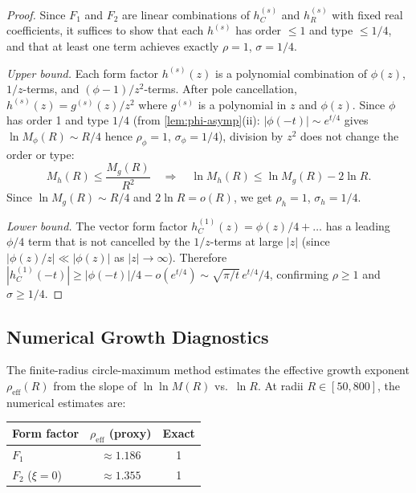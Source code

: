 \documentclass[11pt,a4paper]{article}
\theoremstyle{plain}
\theoremstyle{definition}
\begin{document}
\begin{proof}
Since $F_1$ and $F_2$ are linear combinations of $h_C^{(s)}$
and $h_R^{(s)}$ with fixed real coefficients, it suffices to
show that each $h^{(s)}$ has order $\leq 1$ and type $\leq 1/4$,
and that at least one term achieves exactly $\rho = 1$, $\sigma = 1/4$.

\emph{Upper bound.} Each form factor $h^{(s)}(z)$ is a polynomial
combination of $\phi(z)$, $1/z$-terms, and $({\phi-1})/z^2$-terms.
After pole cancellation, $h^{(s)}(z) = g^{(s)}(z)/z^2$ where $g^{(s)}$
is a polynomial in $z$ and $\phi(z)$. Since $\phi$ has order 1 and
type $1/4$ (from \cref{lem:phi-asymp}(ii): $|\phi(-t)| \sim e^{t/4}$
gives $\ln M_\phi(R) \sim R/4$ hence $\rho_\phi = 1$, $\sigma_\phi = 1/4$),
division by $z^2$ does not change the order or type:
\begin{equation}
  M_h(R) \leq \frac{M_g(R)}{R^2}
  \quad\Longrightarrow\quad
  \ln M_h(R) \leq \ln M_g(R) - 2\ln R.
\end{equation}
Since $\ln M_g(R) \sim R/4$ and $2\ln R = o(R)$, we get
$\rho_h = 1$, $\sigma_h = 1/4$.

\emph{Lower bound.} The vector form factor
$h_C^{(1)}(z) = \phi(z)/4 + \ldots$ has a leading $\phi/4$ term that
is not cancelled by the $1/z$-terms at large $|z|$ (since
$|\phi(z)/z| \ll |\phi(z)|$ as $|z| \to \infty$). Therefore
$|h_C^{(1)}(-t)| \geq |\phi(-t)|/4 - o(e^{t/4})
\sim \sqrt{\pi/t}\,e^{t/4}/4$,
confirming $\rho \geq 1$ and $\sigma \geq 1/4$.
\end{proof}

\subsection{Numerical Growth Diagnostics}\label{ssec:growth-numerics}

The finite-radius circle-maximum method estimates the effective growth
exponent $\rho_{\mathrm{eff}}(R)$ from the slope of
$\ln\ln M(R)$ vs.\ $\ln R$. At radii $R \in [50, 800]$, the
numerical estimates are:
\begin{center}
\begin{tabular}{lcc}
\toprule
Form factor & $\rho_{\mathrm{eff}}$ (proxy) & Exact \\
\midrule
$F_1$ & $\approx 1.186$ & 1 \\
$F_2$ ($\xi = 0$) & $\approx 1.355$ & 1 \\
\bottomrule
\end{tabular}
\end{center}
\end{document}
